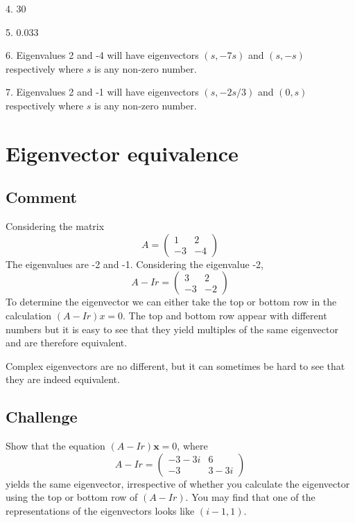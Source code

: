 4. $30$

5. $0.033$

6. Eigenvalues 2 and -4 will have eigenvectors $(s,-7s)$ and $(s,-s)$ respectively where $s$ is any non-zero number.

7. Eigenvalues 2 and -1 will have eigenvectors $(s,-2s/3)$ and $(0,s)$ respectively where $s$ is any non-zero number.


\newpage
\section{Eigenvector equivalence}

\subsection*{Comment}
Considering the matrix
\begin{equation}
    A = \left(
        \begin{array}{cc}
            1 & 2 \\
            -3 & -4
        \end{array}
    \right)
\end{equation}
The eigenvalues are -2 and -1. Considering the eigenvalue -2, 
\begin{equation}
    A - Ir = \left(
        \begin{array}{cc}
            3 & 2 \\
            -3 & -2
        \end{array}
    \right)
\end{equation}
To determine the eigenvector we can either take the top or bottom row in the calculation $(A - Ir)x = 0$.
The top and bottom row appear with different numbers but it is easy to see that they yield multiples of the same eigenvector and are therefore equivalent.

Complex eigenvectors are no different, but it can sometimes be hard to see that they are indeed equivalent.

\subsection*{Challenge}
Show that the equation $(A - Ir)\bm{x} = {0}$, where
\begin{equation}
     A-Ir = \left(
        \begin{array}{cc}
            -3 -3i & 6 \\
            -3 & 3-3i
        \end{array}
    \right)
\end{equation}
yields the same eigenvector, irrespective of whether you calculate the eigenvector using the top or bottom row of $(A-Ir)$. You may find that one of the representations of the eigenvectors looks like $(i-1,1)$.

